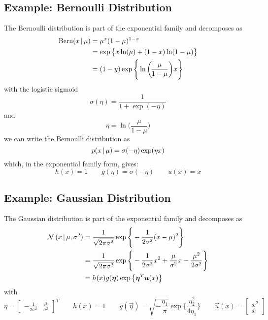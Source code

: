 		\subsection{Example: Bernoulli Distribution}
			The Bernoulli distribution is part of the exponential family and decomposes as
			\begin{align}
				\textrm{Bern}(x \,\vert\, \mu) & = \mu^x (1 - \mu)^{1 - x}                                              \\
				                            & = \exp \big\{ x \ln(\mu) + (1 - x) \ln(1 - \mu) \big\}                 \\
				                            & = (1 - y) \exp \Bigg\{ \ln\bigg(\!\frac{\mu}{1 - \mu} \bigg) x \Bigg\}
			\end{align}
			with the logistic sigmoid
			\begin{equation}
				\sigma(\eta) = \frac{1}{1 + \exp(-\eta)}
			\end{equation}
			and
			\begin{equation}
				\eta = \ln\bigg(\!\frac{\mu}{1 - \mu} \bigg)
			\end{equation}
			we can write the Bernoulli distribution as
			\begin{equation}
				p(x \,\vert\, \mu) = \sigma(-\eta) \exp(\eta x)
			\end{equation}
			which, in the exponential family form, gives:
			\begin{equation}
				h(x) = 1 \qquad g(\eta) = \sigma(-\eta) \qquad u(x) = x
			\end{equation}

		\subsection{Example: Gaussian Distribution}
			The Gaussian distribution is part of the exponential family and decomposes as
			\begin{align}
				\mathcal{N}\,(x \,\vert\, \mu, \sigma^2) & = \frac{1}{\sqrt{2\pi\sigma^2}} \exp\Bigg\{ -\frac{1}{2\sigma^2} (x - \mu)^2 \Bigg\}                                            \\
				                                      & = \frac{1}{\sqrt{2\pi\sigma^2}} \exp\Bigg\{ -\frac{1}{2\sigma^2} x^2 + \frac{\mu}{\sigma^2} x - \frac{\mu^2}{2\sigma^2} \Bigg\} \\
				                                      & = h(x) g(\bm{\eta}) \exp\big\{ \bm{\eta}^T \bm{u}(x) \big\}
			\end{align}
			with
			\begin{equation}
				\eta = \begin{bmatrix} -\frac{1}{2\sigma^2} & \frac{\mu}{\sigma^2} \end{bmatrix}^T \qquad h(x) = 1 \qquad g(\vec{\eta}) = \sqrt{-\frac{\eta_1}{\pi}} \exp \Bigg\{ \frac{\eta_2^2}{4\eta_1} \Bigg\} \qquad \vec{u}(x) = \begin{bmatrix} x^2 \\ x \end{bmatrix}
			\end{equation}

